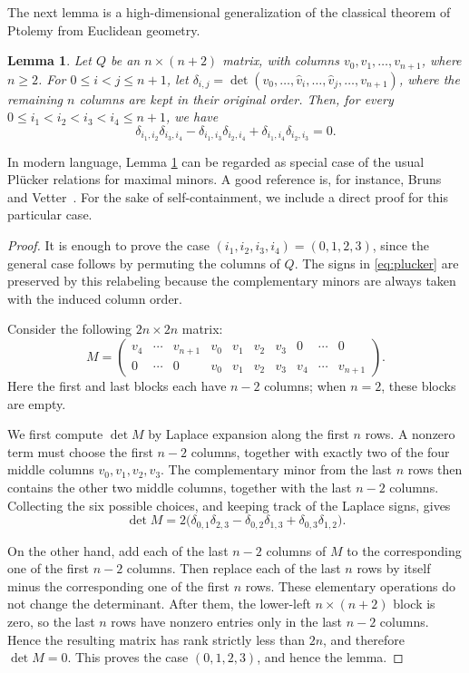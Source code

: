 \documentclass[11pt]{article}
\newtheorem{lemma}[theorem]{Lemma}
\begin{document}
The next lemma is a high-dimensional generalization of the classical theorem of Ptolemy from Euclidean geometry.

\begin{lemma}\label{lem:Plucker}
Let \(Q\) be an \(n\times(n+2)\) matrix, with columns $v_0,v_1,\ldots,v_{n+1}$, where \(n\geq 2\). For \(0\leq i<j\leq n+1\), let $\delta_{i,j}
  =
  \det(v_0,\ldots,\widehat v_i,\ldots,\widehat v_j,\ldots,v_{n+1})$, where the remaining \(n\) columns are kept in their original order. Then, for every $0\leq i_1<i_2<i_3<i_4\leq n+1$, we have
\begin{equation}\label{eq:plucker}
  \delta_{i_1,i_2}\delta_{i_3,i_4}
  -
  \delta_{i_1,i_3}\delta_{i_2,i_4}
  +
  \delta_{i_1,i_4}\delta_{i_2,i_3}
  =
  0.
\end{equation}
\end{lemma}

In modern language, Lemma \ref{lem:Plucker} can be regarded as special case of the usual Pl\"ucker relations for maximal
minors. A good reference is, for instance, Bruns and Vetter~\cite[Lemma 4.4]{BrunsVetter}. For the sake of self-containment, we include a direct proof for this particular case. 

\begin{proof}
It is enough to prove the case $(i_1,i_2,i_3,i_4)=(0,1,2,3)$, since the general case follows by permuting the columns of \(Q\). The signs in
\eqref{eq:plucker} are preserved by this relabeling because the complementary
minors are always taken with the induced column order.

Consider the following \(2n\times 2n\) matrix:
\[
M=
\begin{pmatrix}
v_4&\cdots&v_{n+1}&v_0&v_1&v_2&v_3&0&\cdots&0\\
0&\cdots&0&v_0&v_1&v_2&v_3&v_4&\cdots&v_{n+1}
\end{pmatrix}.
\]
Here the first and last blocks each have \(n-2\) columns; when \(n=2\), these
blocks are empty.

We first compute \(\det M\) by Laplace expansion along the first \(n\) rows. A
nonzero term must choose the first \(n-2\) columns, together with exactly two of
the four middle columns \(v_0,v_1,v_2,v_3\). The complementary minor from the
last \(n\) rows then contains the other two middle columns, together with the
last \(n-2\) columns. Collecting the six possible choices, and keeping track of
the Laplace signs, gives
\[
  \det M
  =
  2\bigl(
  \delta_{0,1}\delta_{2,3}
  -
  \delta_{0,2}\delta_{1,3}
  +
  \delta_{0,3}\delta_{1,2}
  \bigr).
\]

On the other hand, add each of the last \(n-2\) columns of \(M\) to the
corresponding one of the first \(n-2\) columns. Then replace each of the last
\(n\) rows by itself minus the corresponding one of the first \(n\) rows. These
elementary operations do not change the determinant. After them, the lower-left
\(n\times(n+2)\) block is zero, so the last \(n\) rows have nonzero entries only
in the last \(n-2\) columns. Hence the resulting matrix has rank strictly less
than \(2n\), and therefore $\det M=0$. This proves the case \((0,1,2,3)\), and hence the lemma.
\end{proof}
\end{document}

